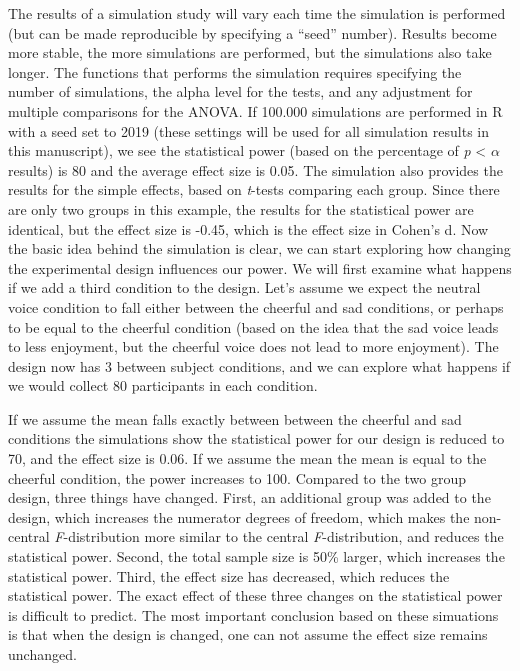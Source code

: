 \documentclass[,man,floatsintext]{apa6}
\begin{document}
The results of a simulation study will vary each time the simulation is
performed (but can be made reproducible by specifying a \enquote{seed}
number). Results become more stable, the more simulations are performed,
but the simulations also take longer. The functions that performs the
simulation requires specifying the number of simulations, the alpha
level for the tests, and any adjustment for multiple comparisons for the
ANOVA. If 100.000 simulations are performed in R with a seed set to 2019
(these settings will be used for all simulation results in this
manuscript), we see the statistical power (based on the percentage of
\emph{p} \textless{} \(\alpha\) results) is 80 and the average effect
size is 0.05. The simulation also provides the results for the simple
effects, based on \emph{t}-tests comparing each group. Since there are
only two groups in this example, the results for the statistical power
are identical, but the effect size is -0.45, which is the effect size in
Cohen's d. Now the basic idea behind the simulation is clear, we can
start exploring how changing the experimental design influences our
power. We will first examine what happens if we add a third condition to
the design. Let's assume we expect the neutral voice condition to fall
either between the cheerful and sad conditions, or perhaps to be equal
to the cheerful condition (based on the idea that the sad voice leads to
less enjoyment, but the cheerful voice does not lead to more enjoyment).
The design now has 3 between subject conditions, and we can explore what
happens if we would collect 80 participants in each condition.

If we assume the mean falls exactly between between the cheerful and sad
conditions the simulations show the statistical power for our design is
reduced to 70, and the effect size is 0.06. If we assume the mean the
mean is equal to the cheerful condition, the power increases to 100.
Compared to the two group design, three things have changed. First, an
additional group was added to the design, which increases the numerator
degrees of freedom, which makes the non-central \emph{F}-distribution
more similar to the central \emph{F}-distribution, and reduces the
statistical power. Second, the total sample size is 50\% larger, which
increases the statistical power. Third, the effect size has decreased,
which reduces the statistical power. The exact effect of these three
changes on the statistical power is difficult to predict. The most
important conclusion based on these simuations is that when the design
is changed, one can not assume the effect size remains unchanged.
\end{document}
